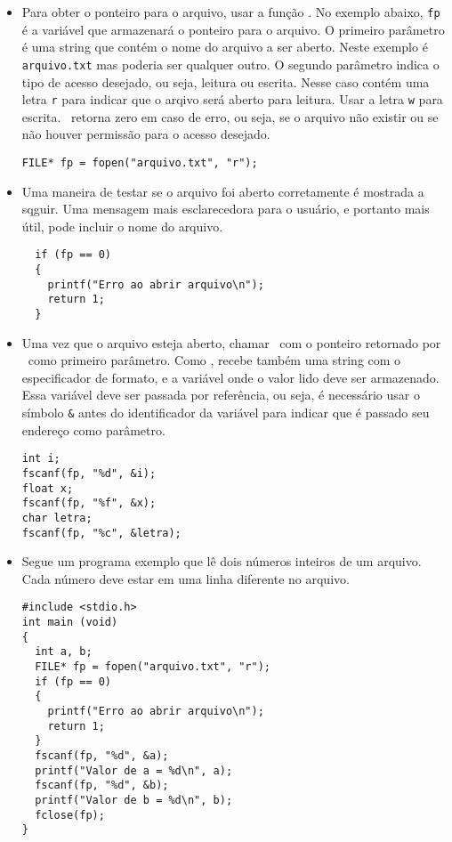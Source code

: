 \begin{itemize}

\item Para obter o ponteiro para o arquivo, usar a função \FOPEN. No exemplo abaixo, {\tt fp} é a variável que armazenará o ponteiro para o arquivo. O primeiro parâmetro é uma string que contém o nome do arquivo a ser aberto. Neste exemplo é {\tt arquivo.txt} mas poderia ser qualquer outro. O segundo parâmetro indica o tipo de acesso desejado, ou seja, leitura ou escrita. Nesse caso contém uma letra {\tt r} para indicar que o arqivo será aberto para leitura. Usar a letra {\tt w} para escrita. \FOPEN\ retorna zero em caso de erro, ou seja, se o arquivo não existir ou se não houver permissão para o acesso desejado.

\begin{lstlisting}
FILE* fp = fopen("arquivo.txt", "r");
\end{lstlisting}

\item Uma maneira de testar se o arquivo foi aberto corretamente é mostrada a sqguir. Uma mensagem mais esclarecedora para o usuário, e portanto mais útil, pode incluir o nome do arquivo.

\begin{lstlisting}
  if (fp == 0)
  {
    printf("Erro ao abrir arquivo\n");
    return 1;
  }
\end{lstlisting}


\item Uma vez que o arquivo esteja aberto, chamar \FSCANF\ com o ponteiro retornado por \FOPEN\ como primeiro parâmetro. Como \SCANF, recebe também uma string com o especificador de formato, e a variável onde o valor lido deve ser armazenado. Essa variável deve ser passada por referência, ou seja, é necessário usar o símbolo {\tt \&} antes do identificador da variável para indicar que é passado seu endereço como parâmetro.

\begin{lstlisting}
int i;
fscanf(fp, "%d", &i);
float x;
fscanf(fp, "%f", &x);
char letra;
fscanf(fp, "%c", &letra);
\end{lstlisting}

\item Segue um programa exemplo que lê dois números inteiros de um arquivo. Cada número deve estar em uma linha diferente no arquivo.

\begin{lstlisting}
#include <stdio.h> 
int main (void)
{
  int a, b;
  FILE* fp = fopen("arquivo.txt", "r");
  if (fp == 0)
  {
    printf("Erro ao abrir arquivo\n");
    return 1;
  }
  fscanf(fp, "%d", &a);
  printf("Valor de a = %d\n", a);
  fscanf(fp, "%d", &b);
  printf("Valor de b = %d\n", b);
  fclose(fp);
}
\end{lstlisting}


\end{itemize}
